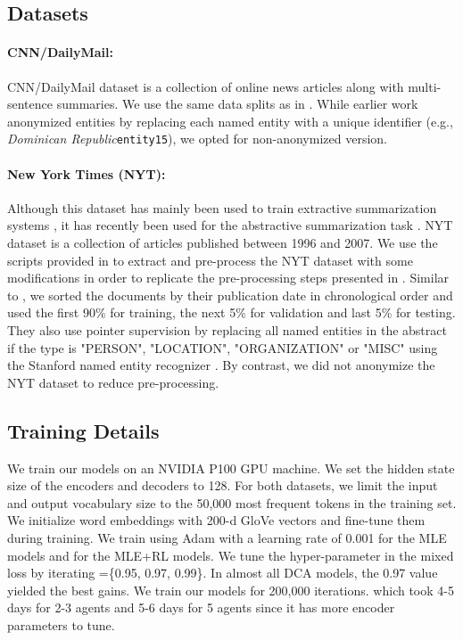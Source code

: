 \documentclass[11pt,a4paper]{article}
\begin{document}
\subsection{Datasets}
\label{app:datasets}
\paragraph{CNN/DailyMail:}
CNN/DailyMail dataset \cite{summs2s,teachingmachines} is a collection of online news articles along with multi-sentence summaries.
We use the same data splits as in \citet{summs2s}. While earlier work anonymized entities by replacing each named entity with a unique identifier (e.g., \textit{Dominican Republic}\texttt{entity15}), we opted for non-anonymized version.

\paragraph{New York Times (NYT):}
Although this dataset has mainly been used to train extractive summarization systems \cite{nyt1,nyt2,nyt3,extractivesum}, it has recently been used for the abstractive summarization task \cite{rlsummsocher}. 
NYT dataset \cite{nytdataset} is a collection of articles published between 1996 and 2007. 
We use the scripts provided in \citet{nyt3} to extract and pre-process the NYT dataset with some modifications in order to replicate the pre-processing steps presented in \citet{rlsummsocher}.
Similar to \cite{rlsummsocher}, we sorted the documents by their publication date in chronological order and used the first 90\% for training, the next 5\% for validation and last 5\% for testing. They also use pointer supervision by replacing all named entities in the abstract if the type is "PERSON", "LOCATION", "ORGANIZATION" or "MISC" using the Stanford named entity recognizer \cite{corenlp}. By contrast, 
we did not anonymize the NYT dataset to reduce pre-processing.  

\subsection{Training Details}
\label{app:training}
We train our models on an NVIDIA P100 GPU machine.
We set the hidden state size of the encoders and decoders to 128.
For both datasets, we limit the input and output vocabulary size to the 50,000 most frequent tokens in the training set. 
We initialize word embeddings with 200-d GloVe vectors \cite{pennington2014glove} and fine-tune them during training.
We train using Adam with a learning rate of 0.001 for the MLE models and  for the MLE+RL models. We tune the  hyper-parameter in the mixed loss by iterating =\{0.95, 0.97, 0.99\}. In almost all DCA models, the 0.97 value yielded the best gains.
We train our models for 200,000 iterations. which took 4-5 days for 2-3 agents and 5-6 days for 5 agents since it has more encoder parameters to tune.
\end{document}
